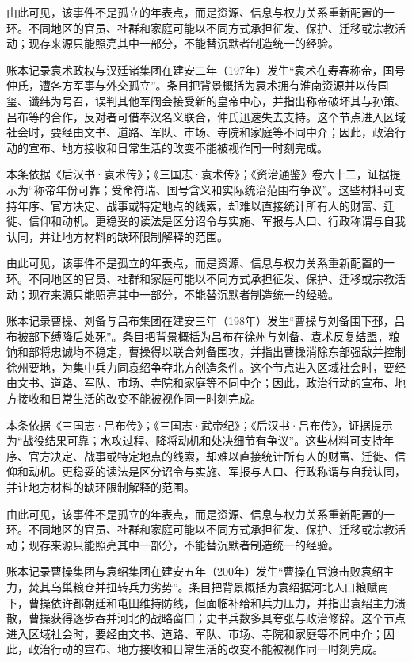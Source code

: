 由此可见，该事件不是孤立的年表点，而是资源、信息与权力关系重新配置的一环。不同地区的官员、社群和家庭可能以不同方式承担征发、保护、迁移或宗教活动；现存来源只能照亮其中一部分，不能替沉默者制造统一的经验。

账本记录袁术政权与汉廷诸集团在建安二年（197年）发生“袁术在寿春称帝，国号仲氏，遭各方军事与外交孤立”。条目把背景概括为袁术拥有淮南资源并以传国玺、谶纬为号召，误判其他军阀会接受新的皇帝中心，并指出称帝破坏其与孙策、吕布等的合作，反对者可借奉汉名义联合，仲氏迅速失去支持。这个节点进入区域社会时，要经由文书、道路、军队、市场、寺院和家庭等不同中介；因此，政治行动的宣布、地方接收和日常生活的改变不能被视作同一时刻完成。

本条依据《后汉书·袁术传》；《三国志·袁术传》；《资治通鉴》卷六十二，证据提示为“称帝年份可靠；受命符瑞、国号含义和实际统治范围有争议”。这些材料可支持年序、官方决定、战事或特定地点的线索，却难以直接统计所有人的财富、迁徙、信仰和动机。更稳妥的读法是区分诏令与实施、军报与人口、行政称谓与自我认同，并让地方材料的缺环限制解释的范围。

由此可见，该事件不是孤立的年表点，而是资源、信息与权力关系重新配置的一环。不同地区的官员、社群和家庭可能以不同方式承担征发、保护、迁移或宗教活动；现存来源只能照亮其中一部分，不能替沉默者制造统一的经验。

账本记录曹操、刘备与吕布集团在建安三年（198年）发生“曹操与刘备围下邳，吕布被部下缚降后处死”。条目把背景概括为吕布在徐州与刘备、袁术反复结盟，粮饷和部将忠诚均不稳定，曹操得以联合刘备围攻，并指出曹操消除东部强敌并控制徐州要地，为集中兵力同袁绍争夺北方创造条件。这个节点进入区域社会时，要经由文书、道路、军队、市场、寺院和家庭等不同中介；因此，政治行动的宣布、地方接收和日常生活的改变不能被视作同一时刻完成。

本条依据《三国志·吕布传》；《三国志·武帝纪》；《后汉书·吕布传》，证据提示为“战役结果可靠；水攻过程、降将动机和处决细节有争议”。这些材料可支持年序、官方决定、战事或特定地点的线索，却难以直接统计所有人的财富、迁徙、信仰和动机。更稳妥的读法是区分诏令与实施、军报与人口、行政称谓与自我认同，并让地方材料的缺环限制解释的范围。

由此可见，该事件不是孤立的年表点，而是资源、信息与权力关系重新配置的一环。不同地区的官员、社群和家庭可能以不同方式承担征发、保护、迁移或宗教活动；现存来源只能照亮其中一部分，不能替沉默者制造统一的经验。

账本记录曹操集团与袁绍集团在建安五年（200年）发生“曹操在官渡击败袁绍主力，焚其乌巢粮仓并扭转兵力劣势”。条目把背景概括为袁绍据河北人口粮赋南下，曹操依许都朝廷和屯田维持防线，但面临补给和兵力压力，并指出袁绍主力溃散，曹操获得逐步吞并河北的战略窗口；史书兵数多具夸张与政治修辞。这个节点进入区域社会时，要经由文书、道路、军队、市场、寺院和家庭等不同中介；因此，政治行动的宣布、地方接收和日常生活的改变不能被视作同一时刻完成。


